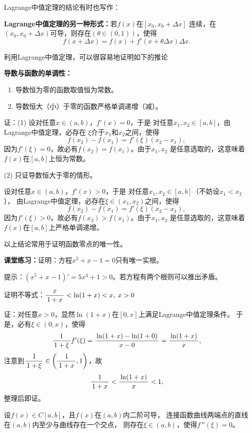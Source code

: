 Lagrange中值定理的结论有时也写作：
\begin{thx}
	{\bf Lagrange中值定理的另一种形式：}若$f(x)$在$[x_0,x_0+\Delta x]$
	连续，在$(x_0,x_0+\Delta x)$可导，则存在$(\theta\in(0,1))$，使得
	$$f(x+\Delta x)=f(x)+f'(x+\theta\Delta x)\Delta x.$$
\end{thx}

\bs
利用Lagrange中值定理，可以很容易地证明如下的推论

\begin{thx}
	{\bf 导数与函数的单调性：}
	\begin{enumerate}[(1)]
	  \item 导数恒为零的函数取值恒为常数。
	  \item 导数恒大（小）于零的函数严格单调递增（减）。
	\end{enumerate}
\end{thx}

证：(1) 设对任意$x\in(a,b)$，$f'(x)=0$，于是
对任意$x_1,x_2\in[a,b]$，由Lagrange中值定理，必存在
$\xi$介于$x_1$和$x_2$之间，使得
$$f(x_2)-f(x_1)=f'(\xi)(x_2-x_1),$$
因为$f'(\xi)=0$，故必有$f(x_2)=f(x_1)$。由于$x_1,x_2$
是任意选取的，这意味着$f(x)$在$[a,b]$上恒为常数。

(2) 只证导数恒大于零的情形。

设对任意$x\in(a,b)$，$f'(x)>0$，于是
对任意$x_1,x_2\in[a,b]$（不妨设$x_1<x_2$），
由Lagrange中值定理，必存在$\xi\in(x_1,x_2)$之间，使得
$$f(x_2)-f(x_1)=f'(\xi)(x_2-x_1),$$
因为$f'(\xi)>0$，故必有$f(x_2)>f(x_1)$。由于$x_1,x_2$
是任意选取的，这意味着$f(x)$在$[a,b]$上严格单调递增。
\fin

以上结论常用于证明函数零点的唯一性。

\bs
{\bf 课堂练习：}证明：方程$x^5+x-1=0$只有唯一实根。

\ifhint
提示：$(x^5+x-1)'=5x^4+1>0$。若方程有两个根则可以推出矛盾。
\fi

\bs
\egz 证明不等式：$\displaystyle\frac{\,{x}\,}{\,{1+x}\,}<\ln(1+x)<x,\;x>0$

证：对任意$x>0$，显然$\ln(1+x)$在$[0,x]$上满足Lagrange中值定理条件。
于是，必有$\xi\in(0,x)$，使得
$$\displaystyle\frac{\,{1}\,}{\,{1+\xi}\,}f'(\xi)=\displaystyle\frac{\,{\ln(1+x)-\ln(1+0)}\,}{\,{x-0}\,}=\displaystyle\frac{\,{\ln(1+x)}\,}{\,{x}\,},$$
注意到$\displaystyle\frac{\,{1}\,}{\,{1+\xi}\,}\in\left(\displaystyle\frac{\,{1}\,}{\,{1+x}\,},1\right)$，故
$$\displaystyle\frac{\,{1}\,}{\,{1+x}\,}<\displaystyle\frac{\,{\ln(1+x)}\,}{\,{x}\,}<1,$$
整理后即证。\fin


\bs
\egz 设$f(x)\in C[a,b]$，且$f(x)$在$(a,b)$内二阶可导，
连接函数曲线两端点的直线在$(a,b)$内至少与曲线存在一个交点，
则存在$\xi\in(a,b)$，使得$f\,''(\xi)=0$。
	
